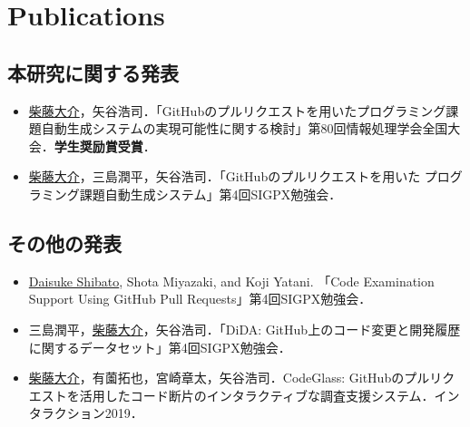 \chapter*{Publications}

\section*{本研究に関する発表}
\begin{itemize}
\item \underline{柴藤大介}，矢谷浩司．「GitHubのプルリクエストを用いたプログラミング課題自動生成システムの実現可能性に関する検討」第80回情報処理学会全国大会．\textbf{学生奨励賞受賞}．
\item \underline{柴藤大介}，三島潤平，矢谷浩司．「GitHubのプルリクエストを用いた プログラミング課題自動生成システム」第4回SIGPX勉強会．
\end{itemize}

\section*{その他の発表}
\begin{itemize}
\item \underline{Daisuke Shibato}, Shota Miyazaki, and Koji Yatani. 「Code Examination Support Using GitHub Pull Requests」第4回SIGPX勉強会．
\item 三島潤平，\underline{柴藤大介}，矢谷浩司．「DiDA: GitHub上のコード変更と開発履歴に関するデータセット」第4回SIGPX勉強会．
\item \underline{柴藤大介}，有薗拓也，宮崎章太，矢谷浩司．CodeGlass: GitHubのプルリクエストを活用したコード断片のインタラクティブな調査支援システム．インタラクション2019．
\end{itemize}
